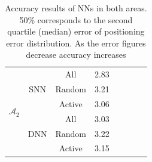 \documentclass[conference]{IEEEtran}
\begin{document}
{\begin{table}[h]
{\begin{tabular} {| c | c | c | c | c | c | c | c |}
				\multirow{6}{10pt}{$\mathcal{A}_2$}&\multirow{3}{10pt}{SNN}&All&2.83 \\ \cline{3-4}
				& &Random&3.21 \\ \cline{3-4}
				& &Active&3.06\\ \cline{2-4}
				&\multirow{3}{10pt}{DNN}&All&3.03\\ \cline{3-4}
				&&Random&3.22\\ \cline{3-4}
				&&Active&3.15\\ \hline
				
		\end{tabular}}
		
		\caption{Accuracy results of NNs in both areas. 50\% corresponds to the second quartile (median) error of positioning error distribution. As the error figures decrease accuracy increases}
		\label{tab:results}
	\end{table}	
	
	
	
}
\end{document}
